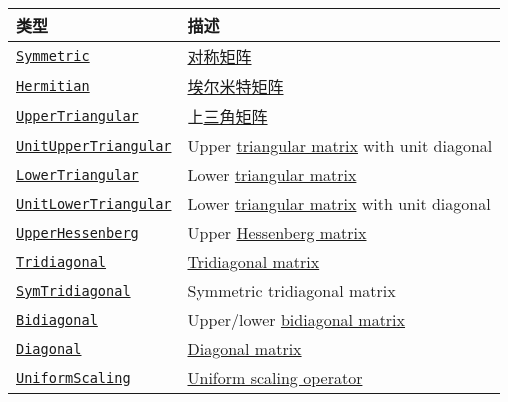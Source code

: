 \begin{table}[h]

\begin{tabulary}{\linewidth}{|L|L|}
\hline
类型 & 描述 \\
\hline
\hyperlink{17683454167504168761}{\texttt{Symmetric}} & \href{https://en.wikipedia.org/wiki/Symmetric\_matrix}{对称矩阵} \\
\hline
\hyperlink{938713992181310063}{\texttt{Hermitian}} & \href{https://en.wikipedia.org/wiki/Hermitian\_matrix}{埃尔米特矩阵} \\
\hline
\hyperlink{6344726545165008167}{\texttt{UpperTriangular}} & 上\href{https://en.wikipedia.org/wiki/Triangular\_matrix}{三角矩阵} \\
\hline
\hyperlink{17221720404477798393}{\texttt{UnitUpperTriangular}} & Upper \href{https://en.wikipedia.org/wiki/Triangular\_matrix}{triangular matrix} with unit diagonal \\
\hline
\hyperlink{15116078732779234709}{\texttt{LowerTriangular}} & Lower \href{https://en.wikipedia.org/wiki/Triangular\_matrix}{triangular matrix} \\
\hline
\hyperlink{2163321084999097240}{\texttt{UnitLowerTriangular}} & Lower \href{https://en.wikipedia.org/wiki/Triangular\_matrix}{triangular matrix} with unit diagonal \\
\hline
\hyperlink{6167777885202579792}{\texttt{UpperHessenberg}} & Upper \href{https://en.wikipedia.org/wiki/Hessenberg\_matrix}{Hessenberg matrix} \\
\hline
\hyperlink{17820886359515748171}{\texttt{Tridiagonal}} & \href{https://en.wikipedia.org/wiki/Tridiagonal\_matrix}{Tridiagonal matrix} \\
\hline
\hyperlink{6062797780727203318}{\texttt{SymTridiagonal}} & Symmetric tridiagonal matrix \\
\hline
\hyperlink{6156150905679680892}{\texttt{Bidiagonal}} & Upper/lower \href{https://en.wikipedia.org/wiki/Bidiagonal\_matrix}{bidiagonal matrix} \\
\hline
\hyperlink{3300114559258360989}{\texttt{Diagonal}} & \href{https://en.wikipedia.org/wiki/Diagonal\_matrix}{Diagonal matrix} \\
\hline
\hyperlink{723087258311673942}{\texttt{UniformScaling}} & \href{https://en.wikipedia.org/wiki/Uniform\_scaling}{Uniform scaling operator} \\
\hline
\end{tabulary}

\end{table}



